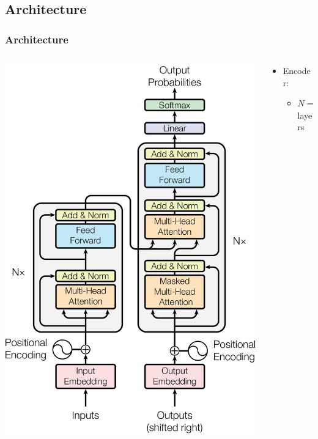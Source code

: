\documentclass[]{beamer}
\begin{document}
\subsection{Architecture}
\begin{frame}
    \frametitle{Architecture}
    \begin{columns}
        \begin{column}[]{0.5\textwidth}
            \includegraphics[scale = 0.4]{ModalNet-21.png}
        \end{column}
        \begin{column}{0.5\textwidth}
            \begin{itemize}
                \item 
                    Encoder: 
                    \begin{itemize}
                        \item $N = 6$ layers

\end{itemize}
\end{itemize}
\end{column}
\end{columns}
\end{frame}
\end{document}
